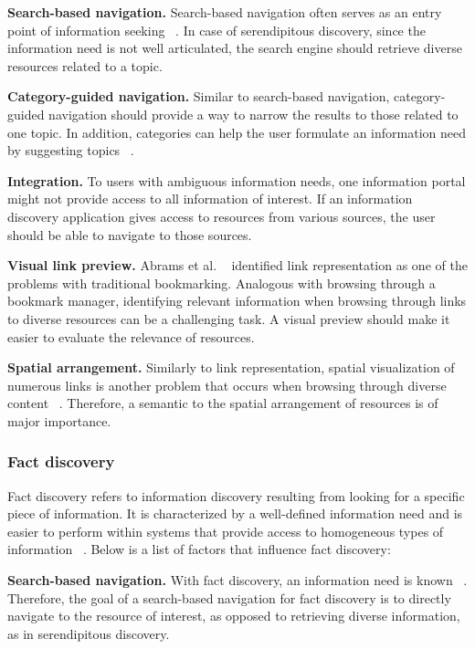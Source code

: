 \documentclass{casconpaper}
\begin{document}
{{\textbf{Search-based navigation.} Search-based navigation often serves as an entry point of information seeking ~\cite{levene}. In case of serendipitous discovery, since the information need is not well articulated, the search engine should retrieve diverse resources related to a topic.

\textbf{Category-guided navigation.} Similar to search-based navigation, category-guided navigation should provide a way to narrow the results to those related to one topic. In addition, categories can help the user formulate an information need by suggesting topics ~\cite{levene}.

\textbf{Integration.} To users with ambiguous information needs, one information portal might not provide access to all information of interest. If an information discovery application gives access to resources from various sources, the user should be able to navigate to those sources.

\textbf{Visual link preview.} Abrams et al. ~\cite{abrams} identified link representation as one of the problems with traditional bookmarking. Analogous with browsing through a bookmark manager, identifying relevant information when browsing through links to diverse resources can be a challenging task. A visual preview should make it easier to evaluate the relevance of resources.

\textbf{Spatial arrangement.} Similarly to link representation, spatial visualization of numerous links is another problem that occurs when browsing through diverse content ~\cite{abrams}. Therefore, a semantic to the spatial arrangement of resources is of major importance.



} %

{\subsubsection{Fact discovery}
Fact discovery refers to information discovery resulting from looking for a specific piece of information. It is characterized by a well-defined information need and is easier to perform within systems that provide access to homogeneous types of information ~\cite{kellar2006, lindley}. Below is a list of factors that influence fact discovery: 

\textbf{Search-based navigation.} With fact discovery, an information need is known ~\cite{kellar2006, kellar2007}. Therefore, the goal of a search-based navigation for fact discovery is to directly navigate to the resource of interest, as opposed to retrieving diverse information, as in serendipitous discovery.

}}
\end{document}

